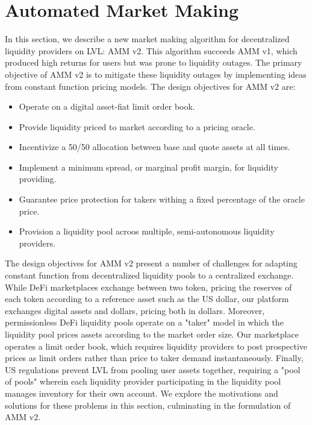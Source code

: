 \documentclass{article}
\begin{document}
\section{Automated Market Making}
\label{sec:amm}

In this section, we describe a new market making algorithm for decentralized liquidity providers on LVL: AMM v2. This algorithm succeeds AMM v1, which produced high returns for users but was prone to liquidity outages. The primary objective of AMM v2 is to mitigate these liquidity outages by implementing ideas from constant function pricing models. The design objectives for AMM v2 are:

\begin{itemize}
  \item Operate on a digital asset-fiat limit order book.
  \item Provide liquidity priced to market according to a pricing oracle.
  \item Incentivize a 50/50 allocation between base and quote assets at all times.
  \item Implement a minimum spread, or marginal profit margin, for liquidity providing.
  \item Guarantee price protection for takers withing a fixed percentage of the oracle price.
  \item Provision a liquidity pool acroos multiple, semi-autonomous liquidity providers.
\end{itemize}

The design objectives for AMM v2 present a number of challenges for adapting constant function from decentralized liquidity pools to a centralized exchange. While DeFi marketplaces exchange between two token, pricing the reserves of each token according to a reference asset such as the US dollar, our platform exchanges digital assets and dollars, pricing both in dollars. Moreover, permissionless DeFi liquidity pools operate on a "taker" model in which the liquidity pool prices assets according to the market order size. Our marketplace operates a limit order book, which requires liquidity providers to post prospective prices as limit orders rather than price to taker demand instantaneously. Finally, US regulations prevent LVL from pooling user assets together, requiring a "pool of pools" wherein each liquidity provider participating in the liquidity pool manages inventory for their own account. We explore the motivations and solutions for these problems in this section, culminating in the formulation of AMM v2.
\end{document}
